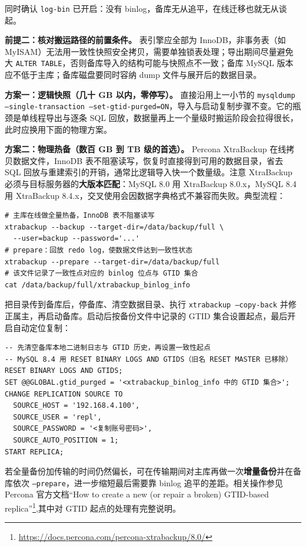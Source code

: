\documentclass[12pt,UTF8]{ctexbook}
\begin{document}
同时确认 \texttt{log-bin} 已开启：没有 binlog，备库无从追平，在线迁移也就无从谈起。

\textbf{前提二：核对搬运路径的前置条件。} 表引擎应全部为 InnoDB，非事务表（如 MyISAM）无法用一致性快照安全拷贝，需要单独锁表处理；导出期间尽量避免大 \texttt{ALTER TABLE}，否则备库导入的结构可能与快照点不一致；备库 MySQL 版本应不低于主库；备库磁盘要同时容纳 dump 文件与展开后的数据目录。

\textbf{方案一：逻辑快照（几十 GB 以内，零停写）。} 直接沿用上一小节的 \texttt{mysqldump --single-transaction --set-gtid-purged=ON}，导入与启动复制步骤不变。它的瓶颈是单线程导出与逐条 SQL 回放，数据量再上一个量级时搬运阶段会拉得很长，此时应换用下面的物理方案。

\textbf{方案二：物理热备（数百 GB 到 TB 级的首选）。} Percona XtraBackup 在线拷贝数据文件，InnoDB 表不阻塞读写，恢复时直接得到可用的数据目录，省去 SQL 回放与重建索引的开销，通常比逻辑导入快一个数量级。注意 XtraBackup 必须与目标服务器的\textbf{大版本匹配}：MySQL 8.0 用 XtraBackup 8.0.x，MySQL 8.4 用 XtraBackup 8.4.x，交叉使用会因数据字典格式不兼容而失败。典型流程：

\begin{lstlisting}
# 主库在线做全量热备，InnoDB 表不阻塞读写
xtrabackup --backup --target-dir=/data/backup/full \
  --user=backup --password='...'
# prepare：回放 redo log，使数据文件达到一致性状态
xtrabackup --prepare --target-dir=/data/backup/full
# 该文件记录了一致性点对应的 binlog 位点与 GTID 集合
cat /data/backup/full/xtrabackup_binlog_info
\end{lstlisting}

把目录传到备库后，停备库、清空数据目录、执行 \texttt{xtrabackup --copy-back} 并修正属主，再启动备库。启动后按备份文件中记录的 GTID 集合设置起点，最后开启自动定位复制：

\begin{lstlisting}
-- 先清空备库本地二进制日志与 GTID 历史，再设置一致性起点
-- MySQL 8.4 用 RESET BINARY LOGS AND GTIDS（旧名 RESET MASTER 已移除）
RESET BINARY LOGS AND GTIDS;
SET @@GLOBAL.gtid_purged = '<xtrabackup_binlog_info 中的 GTID 集合>';
CHANGE REPLICATION SOURCE TO
  SOURCE_HOST = '192.168.4.100',
  SOURCE_USER = 'repl',
  SOURCE_PASSWORD = '<复制账号密码>',
  SOURCE_AUTO_POSITION = 1;
START REPLICA;
\end{lstlisting}

若全量备份加传输的时间仍然偏长，可在传输期间对主库再做一次\textbf{增量备份}并在备库依次 \texttt{--prepare}，进一步缩短最后需要靠 binlog 追平的差距。相关操作参见 Percona 官方文档“How to create a new (or repair a broken) GTID-based replica”\footnote{\url{https://docs.percona.com/percona-xtrabackup/8.0/}},其中对 GTID 起点的处理有完整说明。
\end{document}
